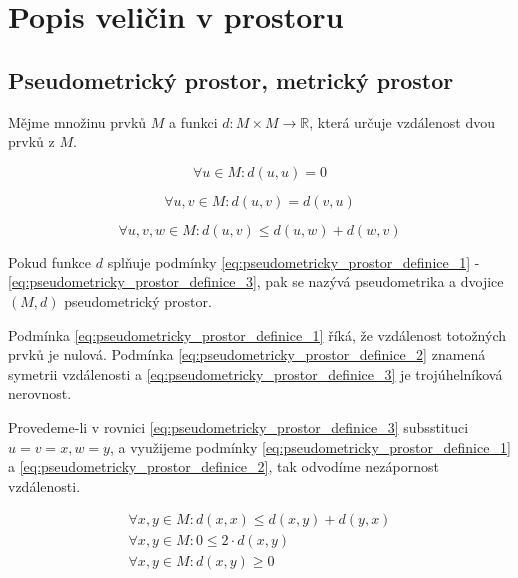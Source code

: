 \chapter{Popis veličin v prostoru}

\section{Pseudometrický prostor, metrický prostor}

Mějme množinu prvků \(M\) a funkci \(d: M \times M \rightarrow \mathbb{R}\), která určuje vzdálenost dvou prvků z \(M\).

\begin{equation}
\label{eq:pseudometricky_prostor_definice_1}
\forall u \in M : d(u, u) = 0
\end{equation}

\begin{equation}
\label{eq:pseudometricky_prostor_definice_2}
\forall u, v \in M : d(u, v) = d(v, u)
\end{equation}

\begin{equation}
\label{eq:pseudometricky_prostor_definice_3}
\forall u, v, w \in M : d(u, v) \leq d(u, w) + d(w, v)
\end{equation}

Pokud funkce \(d\) splňuje podmínky \eqref{eq:pseudometricky_prostor_definice_1} - \eqref{eq:pseudometricky_prostor_definice_3}, pak se nazývá pseudometrika a dvojice \((M, d)\) pseudometrický prostor.

Podmínka \eqref{eq:pseudometricky_prostor_definice_1} říká, že vzdálenost totožných prvků je nulová. Podmínka \eqref{eq:pseudometricky_prostor_definice_2} znamená symetrii vzdálenosti a \eqref{eq:pseudometricky_prostor_definice_3} je trojúhelníková nerovnost.

Provedeme-li v rovnici \eqref{eq:pseudometricky_prostor_definice_3} subsstituci \(u = v = x, w = y\), a využijeme podmínky \eqref{eq:pseudometricky_prostor_definice_1} a \eqref{eq:pseudometricky_prostor_definice_2},
tak odvodíme nezápornost vzdálenosti.

\begin{equation}
\begin{split}
\forall x, y \in M : d(x, x) \leq d(x, y) + d(y, x) \\
\forall x, y \in M : 0 \leq 2 \cdot d(x, y) \\
\forall x, y \in M : d(x, y) \geq 0
\end{split}
\end{equation}

